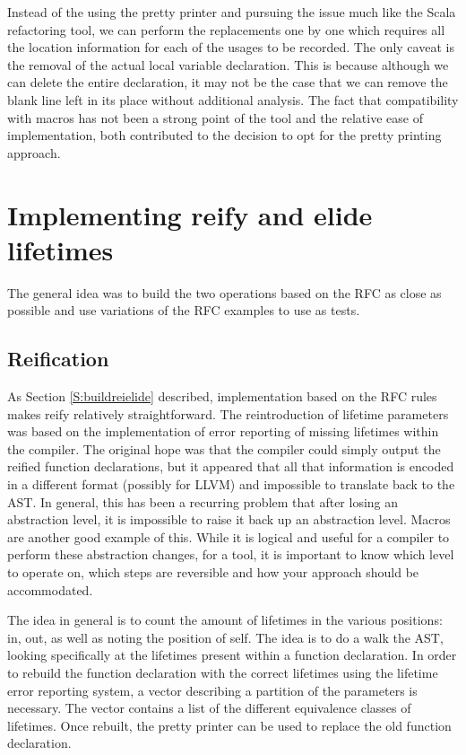 Instead of the using the pretty printer and pursuing the issue much like the Scala refactoring tool, we can perform the replacements one by one which requires all the location information for each of the usages to be recorded. The only caveat is the removal of the actual local variable declaration. This is because although we can delete the entire declaration, it may not be the case that we can remove the blank line left in its place without additional analysis. The fact that compatibility with macros has not been a strong point of the tool and the relative ease of implementation, both contributed to the decision to opt for the pretty printing approach.

\section{Implementing reify and elide lifetimes}\label{S:lifetimeref}
The general idea was to build the two operations based on the RFC as close as possible and use variations of the RFC examples to use as tests.

\subsection{Reification}
As Section \ref{S:buildreielide} described, implementation based on the RFC rules makes reify relatively straightforward. The reintroduction of lifetime parameters was based on the implementation of error reporting of missing lifetimes within the compiler. The original hope was that the compiler could simply output the reified function declarations, but it appeared that all that information is encoded in a different format (possibly for LLVM) and impossible to translate back to the AST. In general, this has been a recurring problem that after losing an abstraction level, it is impossible to raise it back up an abstraction level. Macros are another good example of this. While it is logical and useful for a compiler to perform these abstraction changes, for a tool, it is important to know which level to operate on, which steps are reversible and how your approach should be accommodated.

The idea in general is to count the amount of lifetimes in the various positions: in, out, as well as noting the position of self. The idea is to do a walk the AST, looking specifically at the lifetimes present within a function declaration. In order to rebuild the function declaration with the correct lifetimes using the lifetime error reporting system, a vector describing a partition of the parameters is necessary. The vector contains a list of the different equivalence classes of lifetimes. Once rebuilt, the pretty printer can be used to replace the old function declaration.

